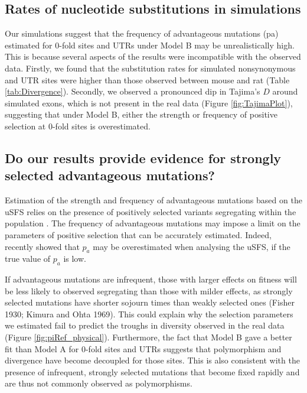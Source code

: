 \subsection{Rates of nucleotide substitutions in simulations}

	Our simulations suggest that the frequency of advantageous mutations (pa) estimated for 0-fold sites and UTRs under Model B may be unrealistically high. This is because several aspects of the results were incompatible with the observed data. Firstly, we found that the substitution rates for simulated nonsynonymous and UTR sites were higher than those observed between mouse and rat (Table \ref{tab:Divergence}). Secondly, we observed a pronounced dip in Tajima’s $D$ around simulated exons, which is not present in the real data (Figure \ref{fig:TajimaPlot}), suggesting that under Model B, either the strength or frequency of positive selection at 0-fold sites is overestimated. 

\subsection{Do our results provide evidence for strongly selected advantageous mutations?}

	Estimation of the strength and frequency of advantageous mutations based on the uSFS relies on the presence of positively selected variants segregating within the population \citep{RN201, RN210, RN354}. The frequency of advantageous mutations may impose a limit on the parameters of positive selection that can be accurately estimated. Indeed, \cite{RN354} recently showed that $p_a$ may be overestimated when analysing the uSFS, if the true value of $p_a$ is low. 

	If advantageous mutations are infrequent, those with larger effects on fitness will be less likely to observed segregating than those with milder effects, as strongly selected mutations have shorter sojourn times than weakly selected ones (Fisher 1930; Kimura and Ohta 1969). This could explain why the selection parameters we estimated fail to predict the troughs in diversity observed in the real data (Figure \ref{fig:piRef_physical}). Furthermore, the fact that Model B gave a better fit than Model A for 0-fold sites and UTRs suggests that polymorphism and divergence have become decoupled for those sites. This is also consistent with the presence of infrequent, strongly selected mutations that become fixed rapidly and are thus not commonly observed as polymorphisms.

